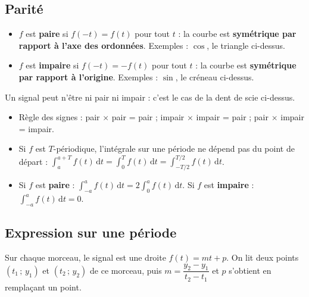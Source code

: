\documentclass[a4paper,11pt]{article}
\begin{document}
\subsection{Parité}\label{subsec:parite}

\begin{definition}
\begin{itemize}
  \item $f$ est \textbf{paire} si $f(-t) = f(t)$ pour tout $t$ : la courbe est \textbf{symétrique par rapport à l'axe des ordonnées}. Exemples : $\cos$, le triangle ci-dessus.
  \item $f$ est \textbf{impaire} si $f(-t) = -f(t)$ pour tout $t$ : la courbe est \textbf{symétrique par rapport à l'origine}. Exemples : $\sin$, le créneau ci-dessus.
\end{itemize}
Un signal peut n'être ni pair ni impair : c'est le cas de la dent de scie ci-dessus.
\end{definition}

\begin{theoreme}\label{th:parite}
\begin{itemize}
  \item Règle des signes : pair $\times$ pair = pair ; impair $\times$ impair = pair ; pair $\times$ impair = impair.
  \item Si $f$ est $T$-périodique, l'intégrale sur une période ne dépend pas du point de départ :
  $\displaystyle\int_a^{a+T} f(t)\,\mathrm dt = \int_0^T f(t)\,\mathrm dt = \int_{-T/2}^{T/2} f(t)\,\mathrm dt$.
  \item Si $f$ est \textbf{paire} : $\displaystyle\int_{-a}^{a} f(t)\,\mathrm dt = 2\int_0^a f(t)\,\mathrm dt$. \quad
  Si $f$ est \textbf{impaire} : $\displaystyle\int_{-a}^{a} f(t)\,\mathrm dt = 0$.
\end{itemize}
\end{theoreme}

\subsection{Expression sur une période}\label{subsec:expression}

\begin{methode}\label{meth:expression}
Sur chaque morceau, le signal est une droite $f(t) = mt + p$. On lit deux points $(t_1\,;\,y_1)$ et $(t_2\,;\,y_2)$ de ce morceau, puis $m = \dfrac{y_2-y_1}{t_2-t_1}$ et $p$ s'obtient en remplaçant un point.
\end{methode}
\end{document}
